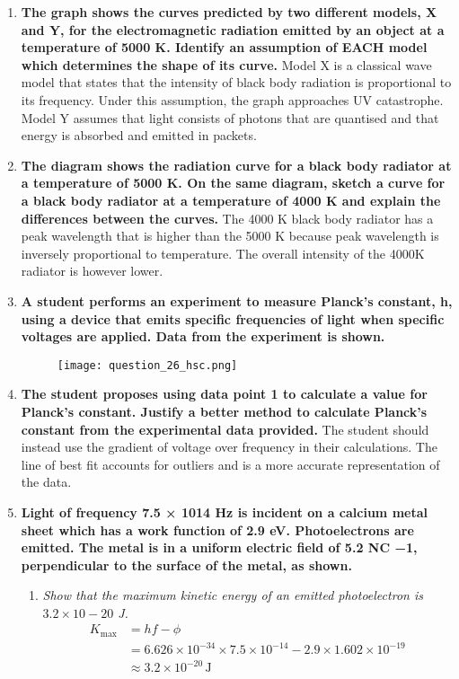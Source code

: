 \documentclass{report}
\begin{document}
\begin{enumerate}
			\item \textbf{The graph shows the curves predicted by two different models, X and Y, for the electromagnetic radiation emitted by an object at a temperature of 5000 K. Identify an assumption of EACH model which determines the shape of its curve.}
				\subitem Model X is a classical wave model that states that the intensity of black body radiation is proportional to its frequency. Under this assumption, the graph approaches UV catastrophe. Model Y assumes that light consists of photons that are quantised and that energy is absorbed and emitted in packets.

			\item \textbf{The diagram shows the radiation curve for a black body radiator at a temperature of 5000 K. On the same diagram, sketch a curve for a black body radiator at a temperature of 4000 K and explain the differences between the curves.}
				\subitem The 4000 K black body radiator has a peak wavelength that is higher than the 5000 K because peak wavelength is inversely proportional to temperature. The overall intensity of the 4000K radiator is however lower.

			\item \textbf{A student performs an experiment to measure Planck’s constant, h, using a device that emits specific frequencies of light when specific voltages are applied. Data from the experiment is shown.}

				\begin{figure}[H]
					\centering
					\texttt{[image: question\_26\_hsc.png]}
				\end{figure}

			\item \textbf{The student proposes using data point 1 to calculate a value for Planck’s constant. Justify a better method to calculate Planck’s constant from the experimental data provided.}
				\subitem The student should instead use the gradient of voltage over frequency in their calculations. The line of best fit accounts for outliers and is a more accurate representation of the data.

			\item \textbf{Light of frequency 7.5 × 1014 Hz is incident on a calcium metal sheet which has a work function of 2.9 eV. Photoelectrons are emitted. The metal is in a uniform electric field of 5.2 NC −1, perpendicular to the surface of the metal, as shown.}
				\begin{enumerate}
					\item \textit{Show that the maximum kinetic energy of an emitted photoelectron is $3.2 \times 10−20$ J.}
						\begin{align*}
							K_\text{max} &= hf - \phi \\
								     &= 6.626 \times 10^{-34} \times 7.5 \times 10^{-14} - 2.9 \times 1.602 \times 10^{-19} \\
								     &\approx 3.2 \times 10^{-20} \, \text{J}
						\end{align*}


\end{enumerate}
\end{enumerate}
\end{document}
